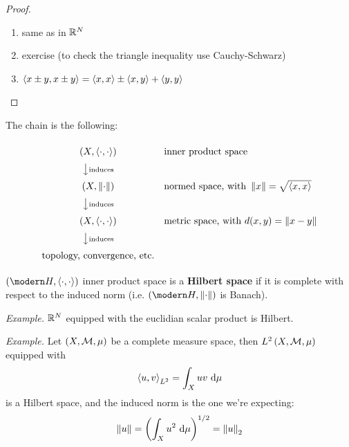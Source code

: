 \begin{proof}\leavevmode
\begin{enumerate}
\item same as in $\mathbb{R}^N$
\item exercise (to check the triangle inequality use Cauchy-Schwarz)
\item $\left\langle x\pm y,x\pm y \right\rangle=\left\langle x,x \right\rangle\pm\left\langle x,y \right\rangle+\left\langle y,y \right\rangle$
\end{enumerate}
\end{proof}

\begin{marker}
The chain is the following:

\begin{equation*}
{\renewcommand*{\arraystretch}{1.5}
\begin{array}{cl}
 \left(X, \sca{\cdot,\cdot} \right) & \text{inner product space} \\
\big\downarrow {\scriptstyle \text{induces} } & \\
\left(X, \norm{\cdot} \right) & \text{normed space, with } \norm{x}=\sqrt{\sca{x,x}} \\
\big\downarrow {\scriptstyle \text{induces} } & \\
\left(X, \sca{\cdot,\cdot} \right) & \text{metric space, with } d(x,y)=\norm{x-y} \\
\big\downarrow {\scriptstyle \text{induces} } & \\
\text{topology, convergence, etc.}
\end{array}}
\end{equation*}
\end{marker}

\begin{defn}
$\left( \Hc,\sca{\cdot,\cdot} \right)$ inner product space is a \textbf{Hilbert space} if it is complete with respect to the induced norm (i.e. $\left( \Hc,\norm{\cdot} \right)$ is Banach).
\end{defn}

\textit{Example.}
$\mathbb{R}^N$ equipped with the euclidian scalar product is Hilbert.

\textit{Example.}
Let $\left( X,\mathcal{M},\mu \right)$ be a complete measure space, then $L^2\left( X,\mathcal{M},\mu \right)$ equipped with
\begin{equation*}
    \left\langle u,v \right\rangle_{L^2}=\int_X uv\  \mathrm{d} \mu
\end{equation*}
is a Hilbert space, and the induced norm is the one we're expecting:
\begin{equation*}
    \left\lVert u \right\rVert=\left( \int_X u^2\  \mathrm{d} \mu \right)^{1/2}=\left\lVert u \right\rVert_2
\end{equation*}

